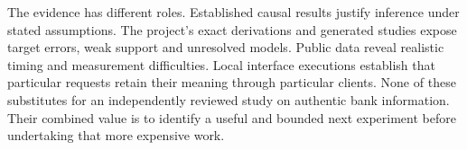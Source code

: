 The evidence has different roles. Established causal results justify inference
under stated assumptions. The project's exact derivations and generated studies
expose target errors, weak support and unresolved models. Public data reveal
realistic timing and measurement difficulties. Local interface executions
establish that particular requests retain their meaning through particular
clients. None of these substitutes for an independently reviewed study on
authentic bank information. Their combined value is to identify a useful and
bounded next experiment before undertaking that more expensive work.



